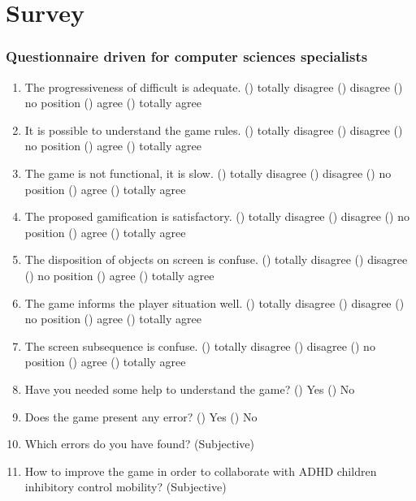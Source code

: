 \chapter{Survey}
\label{ap:measurement-instruments}


\subsection{Questionnaire driven for computer sciences specialists}
\label{ap:sec:cc}

\begin{enumerate}
	\item The progressiveness of difficult is adequate.
	\subitem () totally disagree
	\subitem () disagree
	\subitem () no position
	\subitem () agree
	\subitem () totally agree

	\item  It is possible to understand the game rules.
	\subitem () totally disagree
	\subitem () disagree
	\subitem () no position
	\subitem () agree
	\subitem () totally agree
	
	\item The game is not functional, it is slow.
	\subitem () totally disagree
	\subitem () disagree
	\subitem () no position
	\subitem () agree
	\subitem () totally agree

	\item The proposed gamification is satisfactory.
	\subitem () totally disagree
	\subitem () disagree
	\subitem () no position
	\subitem () agree
	\subitem () totally agree
 
	\item The disposition of objects on screen is confuse.
	\subitem () totally disagree
	\subitem () disagree
	\subitem () no position
	\subitem () agree
	\subitem () totally agree
	
	\item The game informs the player situation well.
	\subitem () totally disagree
	\subitem () disagree
	\subitem () no position
	\subitem () agree
	\subitem () totally agree
	
	\item The screen subsequence is confuse.
		\subitem () totally disagree
		\subitem () disagree
		\subitem () no position
		\subitem () agree
		\subitem () totally agree

	\item Have you needed some help to understand the game?
	\subitem () Yes
	\subitem () No
	\item Does the game present any error?
	\subitem () Yes
	\subitem () No	\item Which errors do you have found? (Subjective)
	
	\item How to improve the game in order to collaborate with ADHD children inhibitory control mobility? 
	(Subjective)
	
\end{enumerate}
